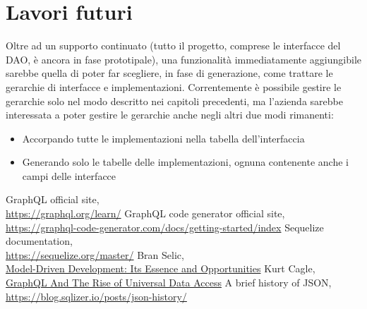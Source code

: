 \documentclass[a4paper, 12pt]{report}
\begin{document}
      \section*{Lavori futuri}
        Oltre ad un supporto continuato (tutto il progetto, comprese le interfacce del DAO, è ancora in fase prototipale), una funzionalità immediatamente aggiungibile sarebbe quella di poter far scegliere, in fase di generazione, come trattare le gerarchie di interfacce e implementazioni.
        Correntemente è possibile gestire le gerarchie solo nel modo descritto nei capitoli precedenti, ma l'azienda sarebbe interessata a poter gestire le gerarchie anche negli altri due modi rimanenti:
        \begin{itemize}
          \item Accorpando tutte le implementazioni nella tabella dell'interfaccia
          \item Generando solo le tabelle delle implementazioni, ognuna contenente anche i campi delle interfacce
        \end{itemize}
    \newpage
    \begin{thebibliography}{3}
      GraphQL official site,\\\href{https://graphql.org/learn/}{https://graphql.org/learn/}
      GraphQL code generator official site,\\\href{https://graphql-code-generator.com/docs/getting-started/index}{https://graphql-code-generator.com/docs/getting-started/index}
      Sequelize documentation,\\\href{https://sequelize.org/master/}{https://sequelize.org/master/}
      Bran Selic,\\\href{https://www.researchgate.net/publication/221249899_Model-Driven_Development_Its_Essence_and_Opportunities}{Model-Driven Development: Its Essence and Opportunities}
      Kurt Cagle,\\\href{https://www.forbes.com/sites/cognitiveworld/2019/10/28/graphql-and-the-rise-of-universal-data-access/?sh=3cb700ac1f71}{GraphQL And The Rise of Universal Data Access}
      A brief history of JSON,\\\href{https://blog.sqlizer.io/posts/json-history/}{https://blog.sqlizer.io/posts/json-history/}
    \end{thebibliography}
\end{document}
